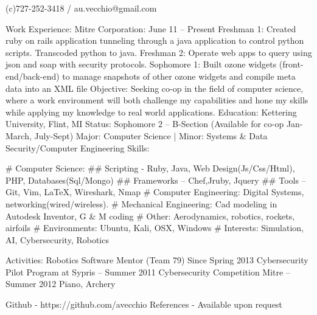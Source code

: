 \documentclass{res}
\begin{document}
\begin{center}
\address{430 Woodlawn Avenue / Belleair, Fl 33756}
(c)727-252-3418 / au.vecchio@gmail.com
\end{center}
Work Experience:
Mitre Corporation: 			June 11 – Present
Freshman 1: Created ruby on rails application tunneling through a java application to control python scripts. Transcoded python to java.
Freshman 2: Operate web apps to query using json and soap with security protocols.
Sophomore 1: Built ozone widgets (front-end/back-end) to manage snapshots of other ozone widgets and compile meta data into an XML file
Objective:
Seeking co-op in the field of computer science, where a work environment will both challenge my capabilities and hone my skills while applying my knowledge to real world applications.
Education:
Kettering University, Flint, MI
Status: Sophomore 2 – B-Section (Available for co-op Jan-March, July-Sept)
Major: Computer Science   |   Minor: Systems \& Data Security/Computer Engineering
Skills:
\begin{easylist}%
	# Computer Science:
		## Scripting - Ruby, Java, Web Design(Js/Css/Html), PHP, Databases(Sql/Mongo)
		## Frameworks – Chef,Jruby, Jquery
		## Tools – Git, Vim, \LaTeX, Wireshark, Nmap
	# Computer Engineering: Digital Systems, networking(wired/wireless).
	# Mechanical Engineering: Cad modeling in Autodesk Inventor, G \& M coding
	# Other: Aerodynamics, robotics, rockets, airfoils
	# Environments: Ubuntu, Kali, OSX, Windows
	# Interests: Simulation, AI, Cybersecurity, Robotics
\end{easylist}
Activities:
Robotics Software Mentor (Team 79) Since Spring 2013
Cybersecurity Pilot Program at Sypris – Summer 2011
Cybersecurity Competition Mitre – Summer 2012
Piano, Archery
\begin{center}
Github - https://github.com/avecchio
References - Available upon request
\end{center}
\end{document}
